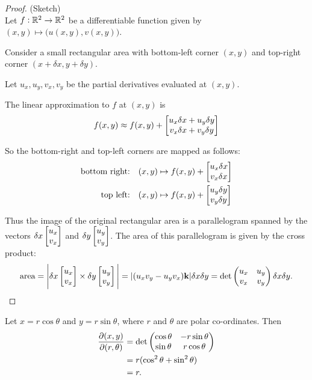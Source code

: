 \begin{proof}(Sketch)\\
  Let $f: \mathbb{R}^2\to\mathbb{R}^2$ be a differentiable function given by
  $(x,y) \mapsto \Big(u(x,y), v(x,y)\Big)$.

  Consider a small rectangular area with bottom-left corner $(x, y)$ and top-right corner
  $(x + \delta x, y + \delta y)$.

  Let $u_x, u_y, v_x, v_y$ be the partial derivatives evaluated at $(x, y)$.

  The linear approximation to $f$ at $(x, y)$ is
  \begin{align*}
    f(x, y) \approx  f(x, y) +
    \begin{bmatrix}u_x\delta x + u_y\delta y\\v_x\delta x + v_y\delta y\end{bmatrix}
  \end{align*}

  So the bottom-right and top-left corners are mapped as follows:
  \begin{align*}
    \text{bottom right:~~~}&
                             (x, y) \mapsto f(x, y) +
                             \begin{bmatrix}u_x\delta x\\v_x\delta x\end{bmatrix}
    \\
    \text{top left:~~~}&
                         (x, y) \mapsto f(x, y) +
                         \begin{bmatrix}u_y\delta y\\v_y\delta y\end{bmatrix}
  \end{align*}

  Thus the image of the original rectangular area is a parallelogram spanned by the vectors
  $\delta x\begin{bmatrix}u_x\\v_x\end{bmatrix}$ and $\delta y\begin{bmatrix}u_y\\v_y\end{bmatrix}$. The area of this parallelogram is given by
  the cross product:
  \begin{align*}
    \text{area}
    = \Bigg|\delta x\begin{bmatrix}u_x\\v_x\end{bmatrix} \times
    \delta y\begin{bmatrix}u_y\\v_y\end{bmatrix}\Bigg|
    = |(u_xv_y - u_yv_x)\mathbf{k}|\delta x \delta y
    = \det \begin{pmatrix}u_x & u_y\\v_x & v_y\\ \end{pmatrix} \delta x \delta y.
  \end{align*}


\end{proof}


\begin{example*}
  Let $x = r\cos\theta$ and $y = r\sin\theta$, where $r$ and $\theta$ are polar co-ordinates. Then
  \begin{align*}
    \frac{\partial(x, y)}{\partial(r, \theta)}
    &= \det \begin{pmatrix}\cos\theta & -r\sin\theta\\\sin\theta & r\cos\theta\\ \end{pmatrix}\\
    &= r(\cos^2\theta + \sin^2\theta)\\
    &= r.
  \end{align*}
\end{example*}

